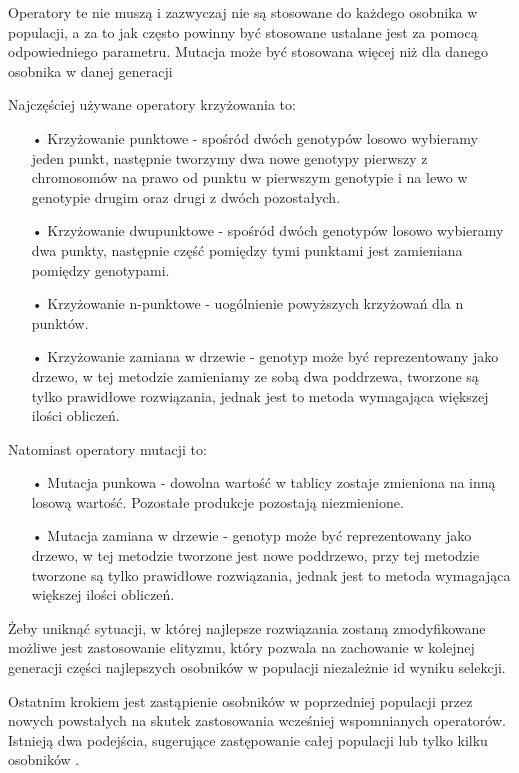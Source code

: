 Operatory te nie muszą i zazwyczaj nie są stosowane do każdego osobnika w populacji, a za to jak często powinny być stosowane ustalane jest za pomocą odpowiedniego parametru. Mutacja może być stosowana więcej niż dla danego osobnika w danej generacji

Najczęściej używane operatory krzyżowania to:
\begin{itemize}
\item[•] Krzyżowanie punktowe - spośród dwóch genotypów losowo wybieramy jeden punkt, następnie tworzymy dwa nowe genotypy pierwszy z chromosomów na prawo od punktu w pierwszym genotypie i na lewo w genotypie drugim oraz drugi z dwóch pozostałych.

\item[•] Krzyżowanie dwupunktowe - spośród dwóch genotypów losowo wybieramy dwa punkty, następnie część pomiędzy tymi punktami jest zamieniana pomiędzy genotypami.

\item[•] Krzyżowanie n-punktowe - uogólnienie powyższych krzyżowań dla n punktów.

\item[•] Krzyżowanie zamiana w drzewie - genotyp może być reprezentowany jako drzewo, w tej metodzie zamieniamy ze sobą dwa poddrzewa, tworzone są tylko prawidłowe rozwiązania, jednak jest to metoda wymagająca większej ilości obliczeń.  
\end{itemize}

Natomiast operatory mutacji to:
\begin{itemize}
\item[•] Mutacja punkowa - dowolna wartość w tablicy zostaje zmieniona na inną losową wartość. Pozostałe produkcje pozostają niezmienione.

\item[•] Mutacja zamiana w drzewie - genotyp może być reprezentowany jako drzewo, w tej metodzie tworzone jest nowe poddrzewo, przy tej metodzie tworzone są tylko prawidłowe rozwiązania, jednak jest to metoda wymagająca większej ilości obliczeń. 
\end{itemize}

Żeby uniknąć sytuacji, w której najlepsze rozwiązania zostaną zmodyfikowane możliwe jest zastosowanie elityzmu, który pozwala na zachowanie w kolejnej generacji części najlepszych osobników w populacji niezależnie id wyniku selekcji.

Ostatnim krokiem jest zastąpienie osobników w poprzedniej populacji przez nowych powstałych na skutek zastosowania wcześniej wspomnianych operatorów. Istnieją dwa podejścia, sugerujące zastępowanie całej populacji lub tylko kilku osobników \cite{SSvsGen}.


